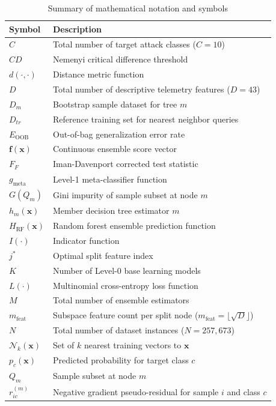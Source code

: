 \documentclass[10pt,conference,compsoc]{IEEEtran}
\begin{document}
\begin{table}[t]
\caption{Summary of mathematical notation and symbols}
\label{tab:notation}
\centering
\begin{tabular}{lp{6.0cm}}
\toprule
\textbf{Symbol} & \textbf{Description} \\
\midrule
$C$ & Total number of target attack classes ($C=10$) \\
$CD$ & Nemenyi critical difference threshold \\
$d(\cdot,\cdot)$ & Distance metric function \\
$D$ & Total number of descriptive telemetry features ($D=43$) \\
$D_m$ & Bootstrap sample dataset for tree $m$ \\
$D_{tr}$ & Reference training set for nearest neighbor queries \\
$E_{\text{OOB}}$ & Out-of-bag generalization error rate \\
$\mathbf{f}(\mathbf{x})$ & Continuous ensemble score vector \\
$F_F$ & Iman-Davenport corrected test statistic \\
$g_{\text{meta}}$ & Level-1 meta-classifier function \\
$G(Q_m)$ & Gini impurity of sample subset at node $m$ \\
$h_m(\mathbf{x})$ & Member decision tree estimator $m$ \\
$H_{\text{RF}}(\mathbf{x})$ & Random forest ensemble prediction function \\
$I(\cdot)$ & Indicator function \\
$j^*$ & Optimal split feature index \\
$K$ & Number of Level-0 base learning models \\
$L(\cdot)$ & Multinomial cross-entropy loss function \\
$M$ & Total number of ensemble estimators \\
$m_{\text{feat}}$ & Subspace feature count per split node ($m_{\text{feat}} = \lfloor \sqrt{D} \rfloor$) \\
$N$ & Total number of dataset instances ($N=257,673$) \\
$\mathcal{N}_k(\mathbf{x})$ & Set of $k$ nearest training vectors to $\mathbf{x}$ \\
$p_c(\mathbf{x})$ & Predicted probability for target class $c$ \\
$Q_m$ & Sample subset at node $m$ \\
$r_{ic}^{(m)}$ & Negative gradient pseudo-residual for sample $i$ and class $c$ \\

\end{tabular}
\end{table}
\end{document}
